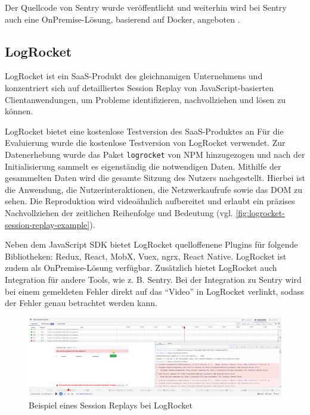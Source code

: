 Der Quellcode von Sentry wurde veröffentlicht und weiterhin wird bei Sentry auch eine OnPremise-Lösung, basierend auf Docker, angeboten \cite{SentrySelfHosted}.

\subsection{LogRocket}

LogRocket \cite{LogRocket} ist ein SaaS-Produkt des gleichnamigen Unternehmens und konzentriert sich auf detailliertes Session Replay von JavaScript-basierten Clientanwendungen, um Probleme identifizieren, nachvollziehen und lösen zu können.

LogRocket bietet eine kostenlose Testversion des SaaS-Produktes an
Für die Evaluierung wurde die kostenlose Testversion von LogRocket verwendet. Zur Datenerhebung wurde das Paket \texttt{logrocket} von NPM hinzugezogen und nach der Initialisierung sammelt es eigenständig die notwendigen Daten. Mithilfe der gesammelten Daten wird die gesamte Sitzung des Nutzers nachgestellt. Hierbei ist die Anwendung, die Nutzerinteraktionen, die Netzwerkaufrufe sowie das DOM zu sehen. Die Reproduktion wird videoähnlich aufbereitet und erlaubt ein präzises Nachvollziehen der zeitlichen Reihenfolge und Bedeutung (vgl. \autoref{fig:logrocket-session-replay-example}).

Neben dem JavaScript SDK bietet LogRocket quelloffenene Plugins für folgende Bibliotheken: Redux, React, MobX, Vuex, ngrx, React Native. LogRocket ist zudem als OnPremise-Lösung verfügbar. Zusätzlich bietet LogRocket auch Integration für andere Tools, wie z. B. Sentry. Bei der Integration zu Sentry wird bei einem gemeldeten Fehler direkt auf das \enquote{Video} in LogRocket verlinkt, sodass der Fehler genau betrachtet werden kann.

\begin{figure}[H]
	\centering
	\includegraphics[width=\linewidth]{img/03_methoden/logrocket_session-replay-example.png}
	\caption{Beispiel eines Session Replays bei LogRocket}
	\label{fig:logrocket-session-replay-example}
\end{figure}

